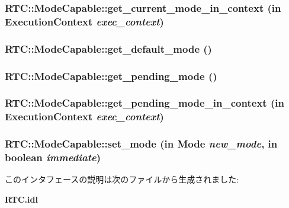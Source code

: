 \subsubsection[{get\_\-current\_\-mode\_\-in\_\-context}]{ RTC::ModeCapable::get\_\-current\_\-mode\_\-in\_\-context (in {\bf ExecutionContext} {\em exec\_\-context})}\label{interfaceRTC_1_1ModeCapable_a7ac136a5b2af22d96574d794f51dd4d5}
\subsubsection[{get\_\-default\_\-mode}]{ RTC::ModeCapable::get\_\-default\_\-mode ()}\label{interfaceRTC_1_1ModeCapable_a5f086a75e4b1f22204bbb892b3062459}
\subsubsection[{get\_\-pending\_\-mode}]{ RTC::ModeCapable::get\_\-pending\_\-mode ()}\label{interfaceRTC_1_1ModeCapable_a134b76f63a0f8003e983f17e9248c81b}
\subsubsection[{get\_\-pending\_\-mode\_\-in\_\-context}]{ RTC::ModeCapable::get\_\-pending\_\-mode\_\-in\_\-context (in {\bf ExecutionContext} {\em exec\_\-context})}\label{interfaceRTC_1_1ModeCapable_a498bca5581602bc6421bfa9d3cde0f1d}
\subsubsection[{set\_\-mode}]{ RTC::ModeCapable::set\_\-mode (in {\bf Mode} {\em new\_\-mode}, \/  in boolean {\em immediate})}\label{interfaceRTC_1_1ModeCapable_a07a6b11c57aef34b362ebd8c3bf9a462}


このインタフェースの説明は次のファイルから生成されました:\begin{DoxyCompactItemize}
\item 
{\bf RTC.idl}\end{DoxyCompactItemize}

